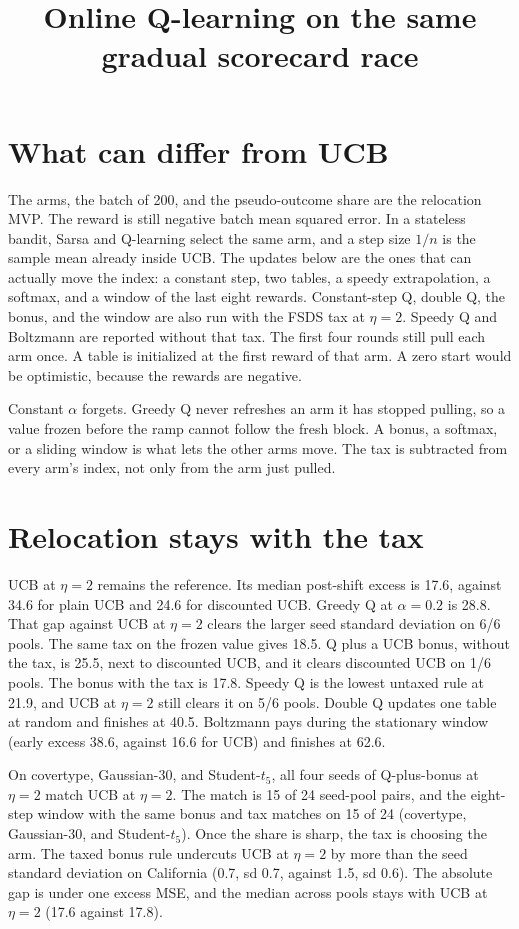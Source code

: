 \documentclass[11pt]{article}
\title{Online Q-learning on the same gradual scorecard race}
\author{}
\date{}
\begin{document}
\maketitle

\section{What can differ from UCB}

The arms, the batch of 200, and the pseudo-outcome share are the relocation MVP.
The reward is still negative batch mean squared error. In a stateless bandit,
Sarsa and Q-learning select the same arm, and a step size \(1/n\) is the sample
mean already inside UCB. The updates below are the ones that can actually move
the index: a constant step, two tables, a speedy extrapolation, a softmax, and
a window of the last eight rewards. Constant-step Q, double Q, the bonus,
and the window are also run with the FSDS tax at \(\eta=2\). Speedy Q and
Boltzmann are reported without that tax. The first four rounds still pull each
arm once. A table is
initialized at the first reward of that arm. A zero start would be optimistic,
because the rewards are negative.

Constant \(\alpha\) forgets. Greedy Q never refreshes an arm it has stopped
pulling, so a value frozen before the ramp cannot follow the fresh block.
A bonus, a softmax, or a sliding window is what lets the other arms move.
The tax is subtracted from every arm's index, not only from the arm just pulled.

\section{Relocation stays with the tax}

UCB at \(\eta=2\) remains the reference. Its median post-shift excess is
17.6, against 34.6
for plain UCB and 24.6 for discounted UCB.
Greedy Q at \(\alpha=0.2\) is 28.8. That gap
against UCB at \(\eta=2\) clears the larger seed standard deviation on
6/6 pools. The same tax on the frozen
value gives 18.5. Q plus a UCB bonus, without
the tax, is 25.5, next to discounted UCB, and
it clears discounted UCB on 1/6 pools.
The bonus with the tax is 17.8. Speedy Q is
the lowest untaxed rule at 21.9, and UCB at
\(\eta=2\) still clears it on 5/6 pools.
Double Q updates one table at random and finishes at
40.5. Boltzmann pays during the stationary window
(early excess 38.6, against
16.6 for UCB) and finishes at
62.6.

On covertype, Gaussian-30, and Student-$t_5$, all four seeds of Q-plus-bonus at \(\eta=2\) match
UCB at \(\eta=2\). The match is 15 of 24 seed-pool pairs, and the
eight-step window with the same bonus and tax matches on 15 of 24
(covertype, Gaussian-30, and Student-$t_5$). Once the share is sharp, the tax is choosing the arm.
The taxed bonus rule undercuts UCB at \(\eta=2\) by more than the seed standard
deviation on California (0.7, sd 0.7, against 1.5, sd 0.6). The absolute gap is under one excess MSE, and the
median across pools stays with UCB at \(\eta=2\)
(17.6 against
17.8).
\end{document}
